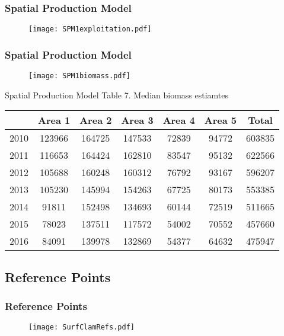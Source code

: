 \documentclass{beamer}
\begin{document}
\begin{frame}
\frametitle{Spatial Production Model}

\begin{figure}
        \begin{center}
            \texttt{[image: SPM1exploitation.pdf]}
        \end{center}
    \end{figure}


\end{frame}

\begin{frame}
\frametitle{Spatial Production Model}

\begin{figure}
        \begin{center}
            \texttt{[image: SPM1biomass.pdf]}
        \end{center}
    \end{figure}


\end{frame}

\begin{frame}{Spatial Production Model}
Table 7. Median biomass estiamtes 
\centering
\begin{tabular}{|c|c|c|c|c|c|c|}
\hline
& Area 1 & Area 2 & Area 3 & Area 4 & Area 5 & Total \\
\hline
2010 & 123966 & 164725 & 147533 & 72839 & 94772 & 603835 \\
\hline
2011 & 116653 & 164424 & 162810 & 83547 & 95132 & 622566 \\
\hline
2012 & 105688 & 160248 & 160312 & 76792 & 93167 & 596207 \\
\hline
2013 & 105230 & 145994 & 154263 & 67725 & 80173 & 553385 \\
\hline
2014 & 91811 & 152498 & 134693 & 60144 & 72519 & 511665 \\
\hline
2015 & 78023 & 137511 & 117572 & 54002 & 70552 & 457660 \\
\hline
2016 & 84091 & 139978 & 132869 & 54377 & 64632 & 475947 \\
\hline
\end{tabular}
\end{frame}
 
\subsection{Reference Points}
\begin{frame}
\frametitle{Reference Points}

\begin{figure}
        \begin{center}
            \texttt{[image: SurfClamRefs.pdf]}
        \end{center}
    \end{figure}


\end{frame}
\end{document}
